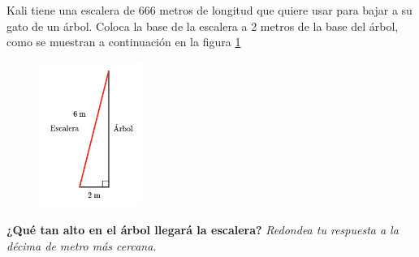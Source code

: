 \question[15]  Kali tiene una escalera de 666 metros de longitud que quiere usar para bajar a su gato de un árbol.
Coloca la base de la escalera a 2 metros de la base del árbol,
como se muestran a continuación en la figura \ref{fig:proverb_pitagoras_06}
\begin{figure}[H]
    \begin{center}
        \includegraphics[width=0.3\textwidth]{../images/proverb_pitagoras_06.png}
    \end{center}
    \caption{}
    \label{fig:proverb_pitagoras_06}
\end{figure}
\textbf{¿Qué tan alto en el árbol llegará la escalera?}
\textit{Redondea tu respuesta a la décima de metro más cercana.}